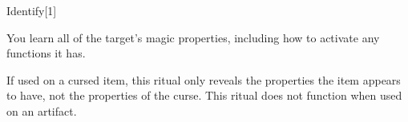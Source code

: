 \begin{spellsection}{Identify}[1]
    \begin{spellheader}
    \end{spellheader}
    \begin{spellcontent}
        \begin{spelltargetinginfo}
        \end{spelltargetinginfo}
        \begin{spelleffects}
            \spelleffect You learn all of the target's magic properties, including how to activate any functions it has.
        \end{spelleffects}
    \end{spellcontent}
    \begin{spellfooter}
        \spellnotes If used on a cursed item, this ritual only reveals the properties the item appears to have, not the properties of the curse. This ritual does not function when used on an artifact.
    \end{spellfooter}
    \begin{spellaugments}
    \end{spellaugments}
\end{spellsection}

